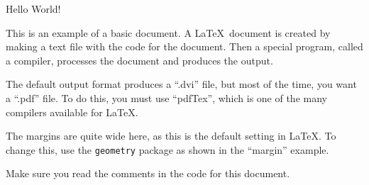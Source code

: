 \documentclass[a4paper,12pt]{article} %
\begin{document}
Hello World!

This is an example of a basic document. A \LaTeX\ document is created by making a text file with the code for the document. Then a special program, called a compiler, processes the document and produces the output.

The default output format produces a ``.dvi'' file, but most of the time, you want a ``.pdf'' file. To do this, you must use ``pdfTex'', which is one of the many compilers available for \LaTeX.

The margins are quite wide here, as this is the default setting in \LaTeX. To change this, use the \texttt{geometry} package as shown in the ``margin'' example.

Make sure you read the comments in the code for this document.
\end{document}
